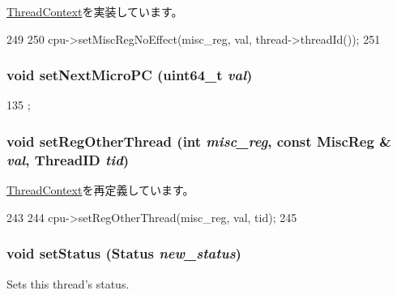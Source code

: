 \hyperlink{classThreadContext_a2987c1ff22ebdf6cdf354a31462bdbfb}{ThreadContext}を実装しています。


\begin{DoxyCode}
249 {
250     cpu->setMiscRegNoEffect(misc_reg, val, thread->threadId());
251 }
\end{DoxyCode}
\hypertarget{classInOrderThreadContext_a6999c039aaa68770e67923328abde58c}{
\subsubsection[{setNextMicroPC}]{\setlength{\rightskip}{0pt plus 5cm}void setNextMicroPC (uint64\_\-t {\em val})}}
\label{classInOrderThreadContext_a6999c039aaa68770e67923328abde58c}



\begin{DoxyCode}
135 { };
\end{DoxyCode}
\hypertarget{classInOrderThreadContext_ae9e72cf93b574d00d7f1652fcafe7449}{
\subsubsection[{setRegOtherThread}]{\setlength{\rightskip}{0pt plus 5cm}void setRegOtherThread (int {\em misc\_\-reg}, \/  const {\bf MiscReg} \& {\em val}, \/  {\bf ThreadID} {\em tid})}}
\label{classInOrderThreadContext_ae9e72cf93b574d00d7f1652fcafe7449}


\hyperlink{classThreadContext_a20daffa344b5c94c4bb2b5f8973a72d1}{ThreadContext}を再定義しています。


\begin{DoxyCode}
243 {
244     cpu->setRegOtherThread(misc_reg, val, tid);
245 }
\end{DoxyCode}
\hypertarget{classInOrderThreadContext_acdf331c877974ed8697216475a21998d}{
\subsubsection[{setStatus}]{\setlength{\rightskip}{0pt plus 5cm}void setStatus ({\bf Status} {\em new\_\-status})}}
\label{classInOrderThreadContext_acdf331c877974ed8697216475a21998d}
Sets this thread's status. 

